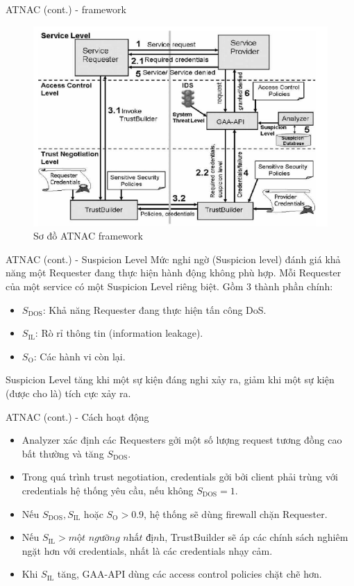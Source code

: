 \documentclass[11pt]{beamer}
\begin{document}
\begin{frame}{ATNAC (cont.) - framework}
\begin{figure}
\centering
\includegraphics[scale=.5]{img/atnac.png}
\caption{Sơ đồ ATNAC framework}
\label{fig:atnac}
\end{figure}
\end{frame}

\begin{frame}{ATNAC (cont.) - Suspicion Level}
Mức nghi ngờ (Suspicion level) đánh giá khả năng một Requester đang thực hiện hành động không phù hợp. Mỗi Requester của một service có một Suspicion Level riêng biệt. Gồm 3 thành phần chính:
\begin{itemize}
\item $S_\text{DOS}$: Khả năng Requester đang thực hiện tấn công DoS.
\item $S_\text{IL}$: Rò rỉ thông tin (information leakage).
\item $S_\text{O}$: Các hành vi còn lại.
\end{itemize}
Suspicion Level tăng khi một sự kiện đáng nghi xảy ra, giảm khi một sự kiện (được cho là) tích cực xảy ra.
\end{frame}

\begin{frame}{ATNAC (cont.) - Cách hoạt động}
\begin{itemize}
\item Analyzer xác định các Requesters gởi một số lượng request tương đồng cao bất thường và tăng $S_\text{DOS}$.
\item Trong quá trình trust negotiation, credentials gởi bởi client phải trùng với credentials hệ thống yêu cầu, nếu không $S_\text{DOS} = 1$.
\item Nếu $S_\text{DOS}, S_\text{IL}$ hoặc $S_\text{O} > 0.9$, hệ thống sẽ dùng firewall chặn Requester.
\item Nếu $S_\text{IL} > \textit{một ngưỡng nhất định}$, TrustBuilder sẽ áp các chính sách nghiêm ngặt hơn với credentials, nhất là các credentials nhạy cảm.
\item Khi $S_\text{IL}$ tăng, GAA-API dùng các access control policies chặt chẽ hơn.
\end{itemize}
\end{frame}
\end{document}
